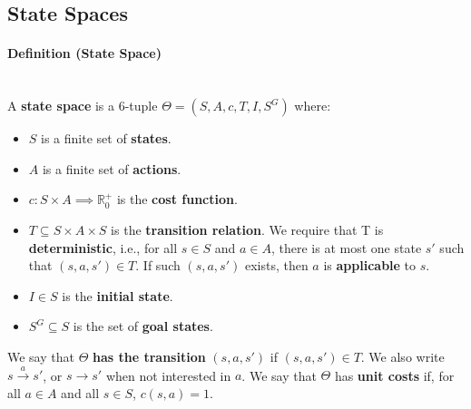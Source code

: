 \documentclass[conference, a4paper]{styles/acmsiggraph}
\newcommand\subsubsubsection{\paragraph}
\begin{document}
    \subsection{State Spaces}
        \subsubsubsection{Definition (State Space)}\ \\
            A \textbf{state space} is a 6-tuple $\Theta = (S,A,c,T,I,S^G)$ where:
            \begin{itemize}
                \item $S$ is a finite set of \textbf{states}.
                \item $A$ is a finite set of \textbf{actions}.
                \item $c : S \times A \implies \mathbb{R}^+_0$ is the \textbf{cost function}.
                \item $T \subseteq S \times A \times S$ is the \textbf{transition relation}.
                    We require that T is \textbf{deterministic}, i.e., for all $s \in S$ and $a \in A$, there is at most one state $s'$ such that $(s,a,s') \in T$.
                    If such $(s,a,s')$ exists, then $a$ is \textbf{applicable} to $s$.
                \item $I \in S$ is the \textbf{initial state}.
                \item $S^G \subseteq S$ is the set of \textbf{goal states}.
            \end{itemize}
            

        We say that $\Theta$ \textbf{has the transition} $(s,a,s')$ if $(s,a,s') \in T$.
        We also write $s \xrightarrow{a} s'$, or $s \rightarrow s'$ when not interested in $a$.
        We say that $\Theta$ has \textbf{unit costs} if, for all $a \in A$ and all $s \in S$, $c(s,a)=1$.
        
\end{document}
